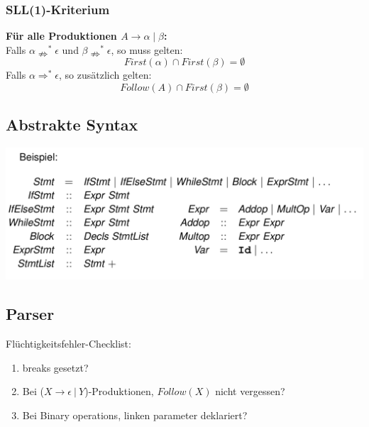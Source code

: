 \subsubsection{SLL(1)-Kriterium}
\textbf{Für alle Produktionen $A \rightarrow \alpha \mid \beta$:}\\
Falls $\alpha \nRightarrow^{*} \epsilon$ und $\beta \nRightarrow^{*} \epsilon$, so muss gelten:
$$First(\alpha) \cap First(\beta) = \emptyset$$
Falls $\alpha \Rightarrow^{*} \epsilon$, so zusätzlich gelten:
$$Follow(A) \cap First(\beta) = \emptyset$$
\subsection{Abstrakte Syntax}
\includegraphics[width=\columnwidth]{images/abstract_syntax.png}
\subsection{Parser}
Flüchtigkeitsfehler-Checklist:
\begin{enumerate}
	\item breaks gesetzt?
	\item Bei ($X\rightarrow \epsilon \medspace \vert \medspace Y$)-Produktionen, $Follow(X)$ nicht vergessen?
	\item Bei Binary operations, linken parameter deklariert?
\end{enumerate}